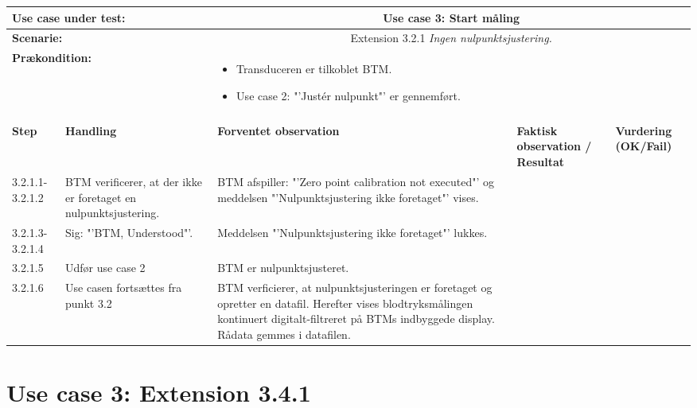 \begin{tabular}{|p{1cm}|p{3cm}|p{4cm}|p{4cm}|p{2cm}|}
\hline
\multicolumn{2}{|p{3cm}|}{\textbf{Use case under test:}} & \multicolumn{3}{c|}{Use case 3: Start måling} \\\hline

\multicolumn{2}{|p{3cm}|}{\textbf{Scenarie:}} & \multicolumn{3}{c|}{Extension 3.2.1 \textit{Ingen nulpunktsjustering.}} \\\hline

\multicolumn{2}{|p{3cm}|}{\textbf{Prækondition:}}  & \multicolumn{3}{l|}{\parbox{0.6\textwidth}{
\begin{itemize}[label=$\circ$]
\item Transduceren er tilkoblet BTM.
\item Use case 2: "'Justér nulpunkt"' er gennemført. 
\end{itemize} }}\\\hline

\multicolumn{5}{|c|}{} \\\hline

\textbf{Step} & \textbf{Handling} & \textbf{Forventet observation} & \textbf{Faktisk observation / Resultat} & \textbf{Vurdering (OK/Fail)}\\\hline

3.2.1.1-3.2.1.2 & BTM verificerer, at der ikke er foretaget en nulpunktsjustering. & BTM afspiller: "'Zero point calibration not executed"' og meddelsen "'Nulpunktsjustering ikke foretaget"' vises. & & \\\hline
3.2.1.3-3.2.1.4 & Sig: "'BTM, Understood"'. & Meddelsen "'Nulpunktsjustering ikke foretaget"' lukkes.  & & 
\\\hline
3.2.1.5 & Udfør use case 2 & BTM er nulpunktsjusteret. & &
\\\hline
3.2.1.6 & Use casen fortsættes fra punkt 3.2 & BTM verficierer, at nulpunktsjusteringen er foretaget og opretter en datafil. Herefter vises blodtryksmålingen kontinuert digitalt-filtreret på BTMs indbyggede display. Rådata gemmes i datafilen. & &
\\\hline

\end{tabular}

\newpage

\section{Use case 3: Extension 3.4.1}

